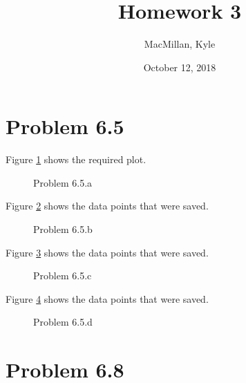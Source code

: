 \documentclass{article}
\title{\textbf{Homework 3}}
\author{MacMillan, Kyle}
\date{October 12, 2018}
\begin{document}
\maketitle

\newpage
\tableofcontents
{}




\newpage
\hypersetup{
    colorlinks,
    citecolor=blue,
    filecolor=black,
    linkcolor=blue,
    urlcolor=blue
}

\setcounter{page}{1}
\newpage
\section{\textbf{Problem 6.5}}
Figure \ref{fig:6.5.a} shows the required plot.

\begin{figure}[htbp]
  \centering
  
  \caption{Problem 6.5.a}
  \label{fig:6.5.a}
\end{figure}


Figure \ref{fig:6.5.b} shows the data points that were saved.

\begin{figure}[htbp]
  \centering
  
  \caption{Problem 6.5.b}
  \label{fig:6.5.b}
\end{figure}


Figure \ref{fig:6.5.c} shows the data points that were saved.

\begin{figure}[htbp]
  \centering
  
  \caption{Problem 6.5.c}
  \label{fig:6.5.c}
\end{figure}


Figure \ref{fig:6.5.d} shows the data points that were saved.

\begin{figure}[htbp]
  \centering
  
  \caption{Problem 6.5.d}
  \label{fig:6.5.d}
\end{figure}


\section{\textbf{Problem 6.8}}
\end{document}
